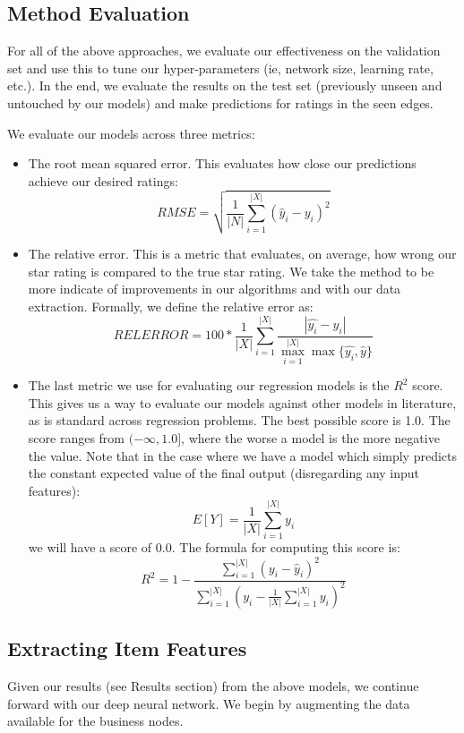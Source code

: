 \documentclass[letterpaper, 10 pt, conference]{ieeeconf}  %
\begin{document}
\subsection{Method Evaluation}

For all of the above approaches, we evaluate our effectiveness on the validation set and use this to tune our hyper-parameters (ie, network size, learning rate, etc.). In the end, we evaluate the results on the test set (previously unseen and untouched by our models) and make predictions for ratings in the seen edges. 

We evaluate our models across three metrics:

\begin{itemize}
\item The root mean squared error. This evaluates how close our predictions achieve our desired ratings:
$$
RMSE = \sqrt{\frac{1}{|N|}\sum_{i = 1}^{|X|} (\hat{y}_i - y_i)^2}
$$
\item The relative error. This is a metric that evaluates, on average, how wrong our star rating is compared to the true star rating. We take the method to be more indicate of improvements in our algorithms and with our data extraction. Formally, we define the relative error as:
$$
RELERROR = 100*\frac{1}{|X|}\sum_{i=1}^{|X|} \frac{|\hat{y_i} - y_i|}{\max_{i=1}^{|X|} \max\{\hat{y_i}, \hat{y}\}}
$$
\item The last metric we use for evaluating our regression models is the $R^2$ score. This gives us a way to evaluate our models against other models in literature, as is standard across regression problems. The best possible score is 1.0. The score ranges from $(-\infty, 1.0]$, where the worse a model is the more negative the value. Note that in the case where we have a model which simply predicts the constant expected value of the final output (disregarding any input features):
$$
E[Y] = \frac{1}{|X|}\sum_{i=1}^{|X|} y_{i}
$$
we will have a score of $0.0$. The formula for computing this score is:
$$
R^2 = 1 - \frac{\sum_{i=1}^{|X|}(y_i - \hat{y}_i)^2}{\sum_{i=1}^{|X|} \left(y_i - \frac{1}{|X|}\sum_{i=1}^{|X|}y_i\right)^2}
$$

\end{itemize}

\subsection{Extracting Item Features}

Given our results (see Results section) from the above models, we continue forward with our deep neural network. We begin by augmenting the data available for the business nodes. 
\end{document}
